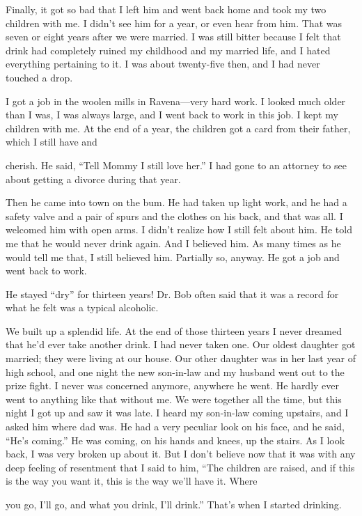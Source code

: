 \begin{biblechapter}
Finally, it got so bad that I left him and went back home and took my two children with me. I didn’t see him for a year, or even hear from him. That was seven or eight years after we were married. I was still bitter because I felt that drink had completely ruined my childhood and my married life, and I hated everything pertaining to it. I was about twenty-five then, and I had never touched a drop.

I got a job in the woolen mills in Ravena—very hard work. I looked much older than I was, I was always large, and I went back to work in this job. I kept my children with me. At the end of a year, the children got a card from their father, which I still have and

cherish. He said, “Tell Mommy I still love her.” I had gone to an attorney to see about getting a divorce during that year.

Then he came into town on the bum. He had taken up light work, and he had a safety valve and a pair of spurs and the clothes on his back, and that was all. I welcomed him with open arms. I didn’t realize how I still felt about him. He told me that he would never drink again. And I believed him. As many times as he would tell me that, I still believed him. Partially so, anyway. He got a job and went back to work.

He stayed “dry” for thirteen years! Dr. Bob often said that it was a record for what he felt was a typical alcoholic.

We built up a splendid life. At the end of those thirteen years I never dreamed that he’d ever take another drink. I had never taken one. Our oldest daughter got married; they were living at our house. Our other daughter was in her last year of high school, and one night the new son-in-law and my husband went out to the prize fight. I never was concerned anymore, anywhere he went. He hardly ever went to anything like that without me. We were together all the time, but this night I got up and saw it was late. I heard my son-in-law coming upstairs, and I asked him where dad was. He had a very peculiar look on his face, and he said, “He’s coming.” He was coming, on his hands and knees, up the stairs. As I look back, I was very broken up about it. But I don’t believe now that it was with any deep feeling of resentment that I said to him, “The children are raised, and if this is the way you want it, this is the way we’ll have it. Where

you go, I’ll go, and what you drink, I’ll drink.” That’s when I started drinking.


\end{biblechapter}
